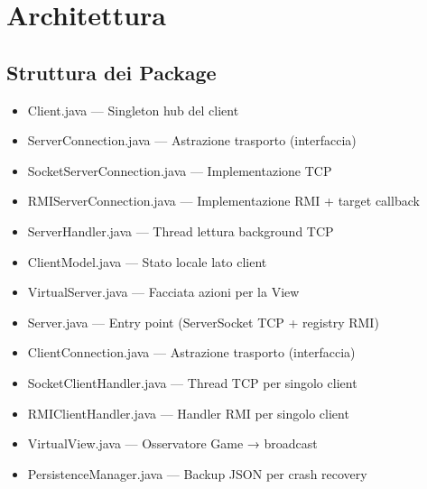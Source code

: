 \documentclass[a4paper,12pt]{article}
\begin{document}
\section{Architettura}

\subsection{Struttura dei Package}

\begin{description}[leftmargin=0pt, font=\ttfamily\bfseries, itemsep=4pt]
  \item[network/client/]
    \begin{itemize}[label=\textendash, leftmargin=1.4cm, font=\ttfamily, itemsep=1pt]
      \item Client.java --- Singleton hub del client
      \item ServerConnection.java --- Astrazione trasporto (interfaccia)
      \item SocketServerConnection.java --- Implementazione TCP
      \item RMIServerConnection.java --- Implementazione RMI + target callback
      \item ServerHandler.java --- Thread lettura background TCP
      \item ClientModel.java --- Stato locale lato client
      \item VirtualServer.java --- Facciata azioni per la View
    \end{itemize}
  \item[network/server/]
    \begin{itemize}[label=\textendash, leftmargin=1.4cm, font=\ttfamily, itemsep=1pt]
      \item Server.java --- Entry point (ServerSocket TCP + registry RMI)
      \item ClientConnection.java --- Astrazione trasporto (interfaccia)
      \item SocketClientHandler.java --- Thread TCP per singolo client
      \item RMIClientHandler.java --- Handler RMI per singolo client
      \item VirtualView.java --- Osservatore Game → broadcast
      \item PersistenceManager.java --- Backup JSON per crash recovery
    \end{itemize}

\end{description}
\end{document}
